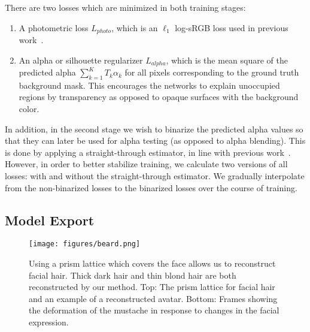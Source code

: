There are two losses which are minimized in both training stages:
\begin{enumerate}
    \item A photometric loss $L_{photo}$, which is an $\ell_1$ log-sRGB loss used in previous work~\cite{hasselgren2021nvdiffmodeling, munkberg2022nvdiffrec}.
    \item An alpha or silhouette regularizer $L_{alpha}$, which is the mean square of the predicted alpha $\sum_{k=1}^{K} T_k \alpha_k$ for all pixels corresponding to the ground truth background mask. This encourages the networks to explain unoccupied regions by transparency as opposed to opaque surfaces with the background color.
\end{enumerate}

In addition, in the second stage we wish to binarize the predicted alpha values so that they can later be used for alpha testing (as opposed to alpha blending). This is done by applying a straight-through estimator, in line with previous work~\cite{bengio2013estimating, chen2023mobilenerf}. However, in order to better stabilize training, we calculate two versions of all losses: with and without the straight-through estimator. We gradually interpolate from the non-binarized losses to the binarized losses over the course of training.


\subsection{Model Export}
\label{subsec_model_export}

\begin{figure*}[h!]
    \centering \texttt{[image: figures/beard.png]}
    \caption{Using a prism lattice which covers the face allows us to reconstruct facial hair. Thick dark hair and thin blond hair are both reconstructed by our method. Top: The prism lattice for facial hair and an example of a reconstructed avatar. Bottom: Frames showing the deformation of the mustache in response to changes in the facial expression.}
    \label{fig_results_beard}
\end{figure*}

